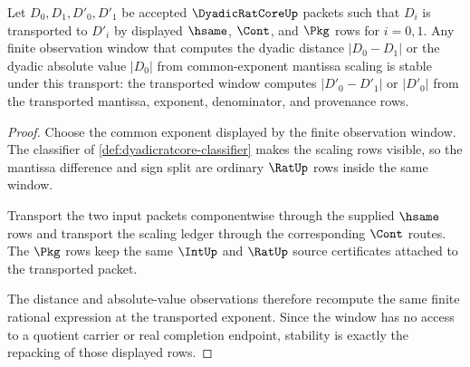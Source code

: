 \begin{theorem}
\label{thm:dyadicratcore-distance-window-stability}
Let $D_0,D_1,D'_0,D'_1$ be accepted $\DyadicRatCoreUp$ packets such that
$D_i$ is transported to $D'_i$ by displayed $\hsame$, $\Cont$, and $\Pkg$ rows
for $i=0,1$. Any finite observation window that computes the dyadic distance
$|D_0-D_1|$ or the dyadic absolute value $|D_0|$ from common-exponent mantissa
scaling is stable under this transport: the transported window computes
$|D'_0-D'_1|$ or $|D'_0|$ from the transported mantissa, exponent, denominator,
and provenance rows.
\end{theorem}
\begin{proof}
Choose the common exponent displayed by the finite observation window. The
classifier of \autoref{def:dyadicratcore-classifier} makes the scaling rows
visible, so the mantissa difference and sign split are ordinary $\RatUp$ rows
inside the same window.

Transport the two input packets componentwise through the supplied $\hsame$
rows and transport the scaling ledger through the corresponding $\Cont$ routes.
The $\Pkg$ rows keep the same $\IntUp$ and $\RatUp$ source certificates attached
to the transported packet.

The distance and absolute-value observations therefore recompute the same
finite rational expression at the transported exponent. Since the window has
no access to a quotient carrier or real completion endpoint, stability is
exactly the repacking of those displayed rows.
\end{proof}
